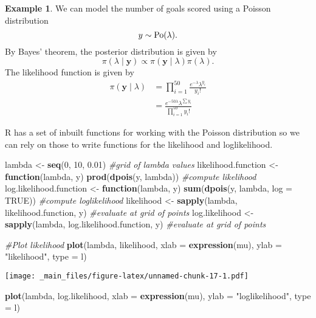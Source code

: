 \documentclass[
]{book}
\newenvironment{Shaded}{\begin{snugshade}}{\end{snugshade}}
\newcommand{\AttributeTok}[1]{\textcolor[rgb]{0.13,0.29,0.53}{#1}}
\newcommand{\CommentTok}[1]{\textcolor[rgb]{0.56,0.35,0.01}{\textit{#1}}}
\newcommand{\ConstantTok}[1]{\textcolor[rgb]{0.56,0.35,0.01}{#1}}
\newcommand{\ControlFlowTok}[1]{\textcolor[rgb]{0.13,0.29,0.53}{\textbf{#1}}}
\newcommand{\DecValTok}[1]{\textcolor[rgb]{0.00,0.00,0.81}{#1}}
\newcommand{\FloatTok}[1]{\textcolor[rgb]{0.00,0.00,0.81}{#1}}
\newcommand{\FunctionTok}[1]{\textcolor[rgb]{0.13,0.29,0.53}{\textbf{#1}}}
\newcommand{\NormalTok}[1]{#1}
\newcommand{\OtherTok}[1]{\textcolor[rgb]{0.56,0.35,0.01}{#1}}
\newcommand{\StringTok}[1]{\textcolor[rgb]{0.31,0.60,0.02}{#1}}
\theoremstyle{definition}
\theoremstyle{definition}
\newtheorem{example}{Example}[chapter]
\theoremstyle{definition}
\theoremstyle{definition}
\theoremstyle{remark}
\begin{document}
\begin{example}
We can model the number of goals scored using a Poisson distribution
\[
y \sim \hbox{Po}(\lambda).
\]
By Bayes' theorem, the posterior distribution is given by
\[
\pi(\lambda \mid \boldsymbol{y}) \propto \pi(\boldsymbol{y} \mid \lambda)\pi(\lambda). 
\]
The likelihood function is given by
\begin{align*}
\pi(\boldsymbol{y} \mid \lambda) &= \prod_{i=1}^50 \frac{e^{-\lambda}\lambda^{y_i}}{y_i!}\\
&= \frac{e^{-50\lambda}\lambda^{\sum y_i}}{\prod_{i=1}^50 y_i!} 
\end{align*}

R has a set of inbuilt functions for working with the Poisson distribution so we can rely on those to write functions for the likelihood and loglikelihood.

\begin{Shaded}
\begin{Highlighting}[]
\NormalTok{lambda }\OtherTok{\textless{}{-}} \FunctionTok{seq}\NormalTok{(}\DecValTok{0}\NormalTok{, }\DecValTok{10}\NormalTok{, }\FloatTok{0.01}\NormalTok{) }\CommentTok{\#grid of lambda values}
\NormalTok{likelihood.function }\OtherTok{\textless{}{-}} \ControlFlowTok{function}\NormalTok{(lambda, y) }\FunctionTok{prod}\NormalTok{(}\FunctionTok{dpois}\NormalTok{(y, lambda)) }\CommentTok{\#compute likelihood}
\NormalTok{log.likelihood.function  }\OtherTok{\textless{}{-}} \ControlFlowTok{function}\NormalTok{(lambda, y) }\FunctionTok{sum}\NormalTok{(}\FunctionTok{dpois}\NormalTok{(y, lambda, }\AttributeTok{log =} \ConstantTok{TRUE}\NormalTok{)) }\CommentTok{\#compute loglikelihood}
\NormalTok{likelihood }\OtherTok{\textless{}{-}} \FunctionTok{sapply}\NormalTok{(lambda,  likelihood.function, y) }\CommentTok{\#evaluate at grid of points}
\NormalTok{log.likelihood }\OtherTok{\textless{}{-}} \FunctionTok{sapply}\NormalTok{(lambda,  log.likelihood.function, y) }\CommentTok{\#evaluate at grid of points}

\CommentTok{\#Plot likelihood}
\FunctionTok{plot}\NormalTok{(lambda, likelihood, }
     \AttributeTok{xlab =} \FunctionTok{expression}\NormalTok{(mu), }\AttributeTok{ylab =} \StringTok{"likelihood"}\NormalTok{, }\AttributeTok{type =} \StringTok{\textquotesingle{}l\textquotesingle{}}\NormalTok{)}
\end{Highlighting}
\end{Shaded}

\texttt{[image: \_main\_files/figure-latex/unnamed-chunk-17-1.pdf]}

\begin{Shaded}
\begin{Highlighting}[]
\FunctionTok{plot}\NormalTok{(lambda, log.likelihood, }
     \AttributeTok{xlab =} \FunctionTok{expression}\NormalTok{(mu), }\AttributeTok{ylab =} \StringTok{"loglikelihood"}\NormalTok{, }\AttributeTok{type =} \StringTok{\textquotesingle{}l\textquotesingle{}}\NormalTok{)}
\end{Highlighting}
\end{Shaded}


\end{example}
\end{document}
